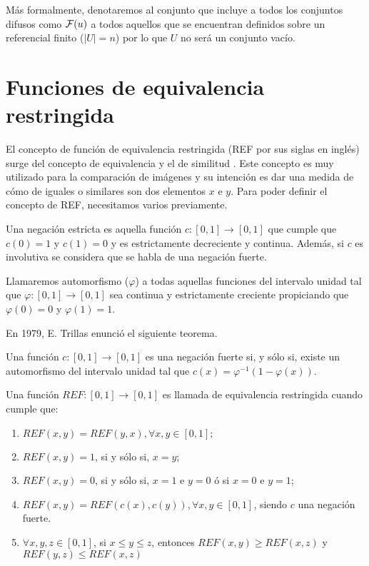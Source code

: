 

Más formalmente, denotaremos al conjunto que incluye a todos los conjuntos difusos como $\mathcal{F}(u)$ a todos aquellos que se encuentran definidos sobre un referencial finito ($|U| = n$) por lo que $U$ no será un conjunto vacío.
 
 \newpage

\section{Funciones de equivalencia restringida}\label{sec:ref}
El concepto de función de equivalencia restringida (REF por sus siglas en inglés) surge del concepto de equivalencia y el de similitud \cite{art:refbarrenechea}. Este concepto es muy utilizado para la comparación de imágenes y su intención es dar una medida de cómo de iguales o similares son dos elementos $x$ e $y$. Para poder definir el concepto de REF, necesitamos varios previamente. 

\begin{definition}\label{def:negacionestricta}
Una negación estricta es aquella función $c : [0, 1] \rightarrow [0, 1]$ que cumple que $c(0)=1$ y $c(1)=0$ y es estrictamente decreciente y continua. Además, si $c$ es involutiva se considera que se habla de una negación fuerte.
\end{definition}

\begin{definition}\label{def:automorfismo}
Llamaremos automorfismo ($\varphi$) a todas aquellas funciones del intervalo unidad tal que $\varphi : [0, 1] \rightarrow [0, 1]$ sea continua y estrictamente creciente propiciando que $\varphi(0)=0$ y $\varphi(1)=1$.
\end{definition}

En 1979, E. Trillas \cite{art:thtrillas} enunció el siguiente teorema. 
\begin{theorem}\label{th:trillas}
Una función $c : [0, 1] \rightarrow [0, 1]$ es una negación fuerte si, y sólo si, existe un automorfismo del intervalo unidad tal que $c(x)=\varphi^{-1}(1-\varphi(x))$.
\end{theorem}

\begin{definition}\label{def:ref}
Una función $REF  : [0, 1] \rightarrow [0, 1]$ es llamada de equivalencia restringida cuando cumple que:
	\begin{enumerate}
	\item $REF(x, y) = REF(y, x), \forall x, y \in [0, 1];$
	\item $REF(x, y) = 1$, si y sólo si, $x=y$;
	\item $REF(x, y) = 0$, si y sólo si, $x=1$ e $y=0$ ó si $x=0$ e $y=1$;
	\item $REF(x, y) = REF(c(x), c(y)),  \forall x, y \in [0, 1]$, siendo $c$ una negación fuerte.
	\item $\forall x, y, z \in [0, 1]$, si $x\leq y\leq z$, entonces $REF(x, y)\geq REF(x, z)$ y  $REF(y, z)\leq REF(x, z)$
	\end{enumerate}
\end{definition}

